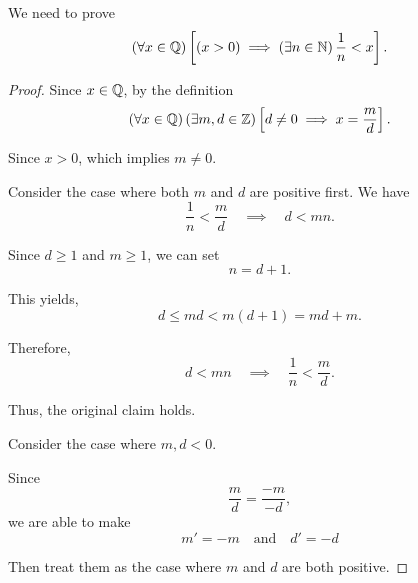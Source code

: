 We need to prove 
\begin{equation*}
    \left(\forall x \in \mathbb{Q}\right)\left[\left(x > 0\right)\implies \left(\exists n \in \mathbb{N}\right)\frac{1}{n} < x\right]. 
\end{equation*}
\begin{proof}
    Since $x \in \mathbb{Q}$, by the definition
    \begin{equation*}
        \left(\forall x \in \mathbb{Q}\right)(\exists m, d \in \mathbb{Z}) \left[d \neq 0 \implies x = \frac{m }{d}\right]. 
    \end{equation*}

    Since $x > 0$, which implies $m \neq 0$. 

    Consider the case where both $m$ and $d$ are positive first. We have 
    \begin{equation*}
        \frac{1}{n} < \frac{m }{d} \quad \implies \quad d < mn. 
    \end{equation*}

    Since $d \geq 1$ and $m \geq 1$, we can set 
    \begin{equation*}
        n = d + 1. 
    \end{equation*}

    This yields, 
    \begin{equation*}
        d \leq md < m(d + 1) = md + m. 
    \end{equation*}

    Therefore, 
    \begin{equation*}
        d < mn \quad \implies \quad \frac{1}{n} < \frac{m }{d}. 
    \end{equation*}

    Thus, the original claim holds. 

    Consider the case where $m, d < 0$. 

    Since 
    \begin{equation*}
        \frac{m  }{d} = \frac{-m }{-d}, 
    \end{equation*}
    we are able to make 
    \begin{equation*}
        m' = -m \quad \text{and} \quad d' = -d
    \end{equation*}

    Then treat them as the case where $m$ and $d$ are both positive. 
\end{proof}

